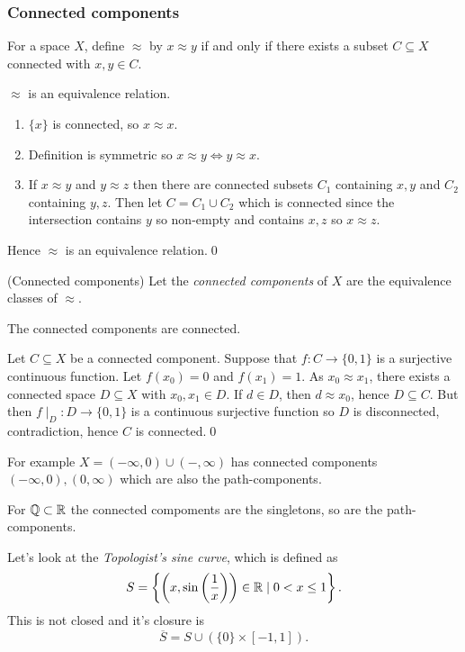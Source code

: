 \documentclass{article}
\begin{document}
\subsubsection{Connected components}
For a space $ X $, define $ \approx  $ by $ x\approx y $ if and only if there exists a subset $ C\subseteq X $ connected with $ x,y\in C $.
\begin{lemma}
  $ \approx $ is an equivalence relation.
\end{lemma}
\pf \begin{enumerate}
	\item $ \{x\} $ is connected, so $ x\approx x $.
	\item Definition is symmetric so $ x\approx y \iff y \approx x $.
	\item If $ x\approx y $ and $ y\approx z $ then there are connected subsets $ C_1 $ containing $ x,y $ and $ C_2 $ containing $ y,z $. Then let $ C=C_1\cup C_2 $ which is connected since the intersection contains $ y $ so non-empty and contains $ x,z $ so $ x\approx z $.
\end{enumerate} 
Hence $ \approx $ is an equivalence relation.\qed
\begin{definition}
	(Connected components) Let the \textit{connected components} of $ X $ are the equivalence classes of $ \approx $.
\end{definition}
\begin{proposition}
  The connected components are connected.
\end{proposition}
\pf Let $ C\subseteq X $ be a connected component. Suppose that $ f:C\to \{0,1\} $ is a surjective continuous function. Let $ f(x_0)= 0 $ and $ f(x_1) = 1 $. As $ x_0\approx x_1 $, there exists a connected space $ D\subseteq X $ with $ x_0,x_1\in D $. If $ d\in D $, then $ d\approx x_0 $, hence $ D\subseteq C $. But then $ f\mid_D:D\to \{0,1\} $ is a continuous surjective function so $ D $ is disconnected, contradiction, hence $ C $ is connected.\qed
\par
For example $ X= (-\infty, 0) \cup (-,\infty) $ has connected components $ (-\infty, 0), (0,\infty) $ which are also the path-components.\par
For $ \mathbb{Q}\subset \mathbb{R} $ the connected compoments are the singletons, so are the path-components.\par
Let's look at the \textit{Topologist's sine curve}, which is defined as
\[
	S = \left\{\left(x,\sin\left(\frac 1x\right)\right)\in \mathbb{R} \mid 0<x\le 1\right\}.
\]
This is not closed and it's closure is
\[
\overline S = S\cup (\{0\} \times [-1,1]).
\]
\end{document}
